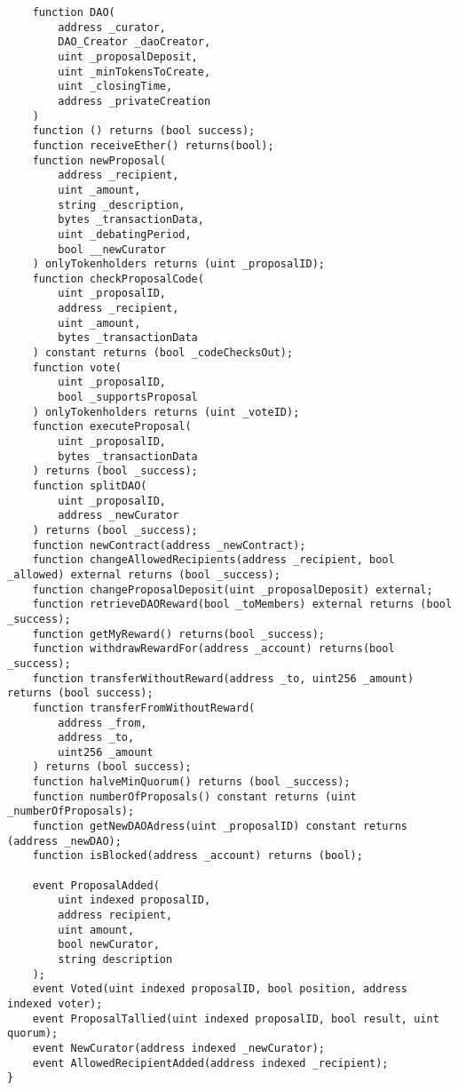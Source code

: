 \documentclass[9pt,oneside]{amsart}
\begin{document}
\begin{verbatim}
    function DAO(
        address _curator,
        DAO_Creator _daoCreator,
        uint _proposalDeposit,
        uint _minTokensToCreate,
        uint _closingTime,
        address _privateCreation
    )
    function () returns (bool success);
    function receiveEther() returns(bool);
    function newProposal(
        address _recipient,
        uint _amount,
        string _description,
        bytes _transactionData,
        uint _debatingPeriod,
        bool __newCurator
    ) onlyTokenholders returns (uint _proposalID);
    function checkProposalCode(
        uint _proposalID,
        address _recipient,
        uint _amount,
        bytes _transactionData
    ) constant returns (bool _codeChecksOut);
    function vote(
        uint _proposalID,
        bool _supportsProposal
    ) onlyTokenholders returns (uint _voteID);
    function executeProposal(
        uint _proposalID,
        bytes _transactionData
    ) returns (bool _success);
    function splitDAO(
        uint _proposalID,
        address _newCurator
    ) returns (bool _success);
    function newContract(address _newContract);
    function changeAllowedRecipients(address _recipient, bool _allowed) external returns (bool _success);
    function changeProposalDeposit(uint _proposalDeposit) external;
    function retrieveDAOReward(bool _toMembers) external returns (bool _success);
    function getMyReward() returns(bool _success);
    function withdrawRewardFor(address _account) returns(bool _success);
    function transferWithoutReward(address _to, uint256 _amount) returns (bool success);
    function transferFromWithoutReward(
        address _from,
        address _to,
        uint256 _amount
    ) returns (bool success);
    function halveMinQuorum() returns (bool _success);
    function numberOfProposals() constant returns (uint _numberOfProposals);
    function getNewDAOAdress(uint _proposalID) constant returns (address _newDAO);
    function isBlocked(address _account) returns (bool);

    event ProposalAdded(
        uint indexed proposalID,
        address recipient,
        uint amount,
        bool newCurator,
        string description
    );
    event Voted(uint indexed proposalID, bool position, address indexed voter);
    event ProposalTallied(uint indexed proposalID, bool result, uint quorum);
    event NewCurator(address indexed _newCurator);
    event AllowedRecipientAdded(address indexed _recipient);
}

\end{verbatim}
\end{document}
